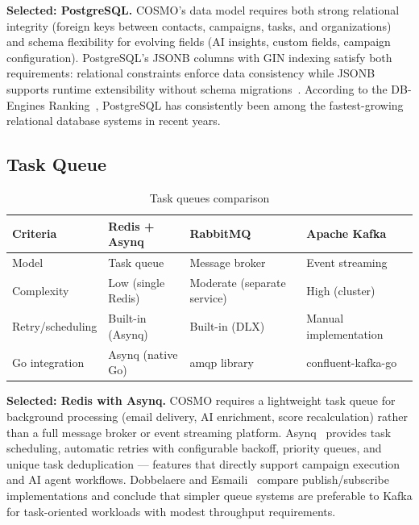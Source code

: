 \documentclass[a4paper]{article}
\begin{document}
\textbf{Selected: PostgreSQL.}
COSMO's data model requires both strong relational integrity
(foreign keys between contacts, campaigns, tasks, and
organizations) and schema flexibility for evolving fields (AI
insights, custom fields, campaign configuration). PostgreSQL's
JSONB columns with GIN indexing satisfy both requirements:
relational constraints enforce data consistency while JSONB
supports runtime extensibility without schema
migrations~\cite{postgresql_jsonb}. According to the DB-Engines
Ranking~\cite{dbengines2025}, PostgreSQL has consistently been
among the fastest-growing relational database systems in recent
years.

\subsection{Task Queue}

\begin{table}[H]
\centering
\caption{Task queues comparison}
\label{tab:task-queue-comparison}
\begin{tabular}{l p{3.5cm} p{3.5cm} p{3.5cm}}
\hline
\textbf{Criteria} & \textbf{Redis + Asynq} & \textbf{RabbitMQ} & \textbf{Apache Kafka} \\
\hline
Model & Task queue & Message broker & Event streaming \\
Complexity & Low (single Redis) & Moderate (separate service) & High (cluster) \\
Retry/scheduling & Built-in (Asynq) & Built-in (DLX) & Manual implementation \\
Go integration & Asynq (native Go) & amqp library & confluent-kafka-go \\
\hline
\end{tabular}
\end{table}

\textbf{Selected: Redis with Asynq.}
COSMO requires a lightweight task queue for background processing
(email delivery, AI enrichment, score recalculation) rather than a
full message broker or event streaming platform.
Asynq~\cite{asynq_github} provides task scheduling, automatic
retries with configurable backoff, priority queues, and unique
task deduplication --- features that directly support campaign
execution and AI agent workflows. Dobbelaere and
Esmaili~\cite{dobbelaere2017kafka} compare publish/subscribe
implementations and conclude that simpler queue systems are
preferable to Kafka for task-oriented workloads with modest
throughput requirements.
\end{document}
